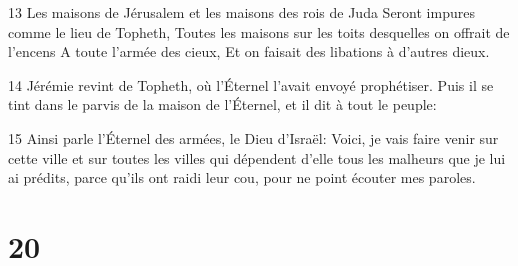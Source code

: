 \par 13 Les maisons de Jérusalem et les maisons des rois de Juda Seront impures comme le lieu de Topheth, Toutes les maisons sur les toits desquelles on offrait de l'encens A toute l'armée des cieux, Et on faisait des libations à d'autres dieux.
\par 14 Jérémie revint de Topheth, où l'Éternel l'avait envoyé prophétiser. Puis il se tint dans le parvis de la maison de l'Éternel, et il dit à tout le peuple:
\par 15 Ainsi parle l'Éternel des armées, le Dieu d'Israël: Voici, je vais faire venir sur cette ville et sur toutes les villes qui dépendent d'elle tous les malheurs que je lui ai prédits, parce qu'ils ont raidi leur cou, pour ne point écouter mes paroles.

\chapter{20}

